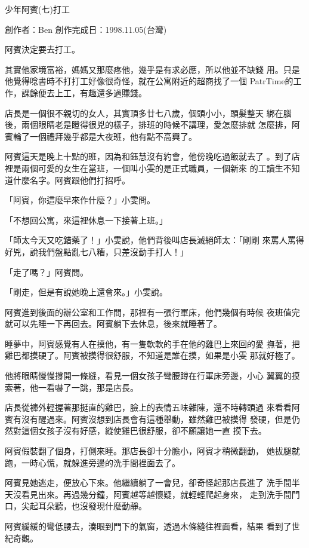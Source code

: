 



少年阿賓(七)打工

創作者：Ben
創作完成日：1998.11.05(台灣)


阿賓決定要去打工。

其實他家境富裕，媽媽又那麼疼他，幾乎是有求必應，所以他並不缺錢
用。只是他覺得唸書時不打打工好像很奇怪，就在公寓附近的超商找了一個
PatrTime的工作，課餘便去上工，有趣還多過賺錢。

店長是一個很不親切的女人，其實頂多廿七八歲，個頭小小，頭髮整天
綁在腦後，兩個眼睛老是瞪得很兇的樣子，排班的時候不講理，愛怎麼排就
怎麼排，阿賓輪了一個禮拜幾乎都是大夜班，他有點不高興了。

阿賓這天是晚上十點的班，因為和鈺慧沒有約會，他傍晚吃過飯就去了
。到了店裡是兩個可愛的女生在當班，一個叫小雯的是正式職員，一個新來
的工讀生不知道什麼名字。阿賓跟他們打招呼。

「阿賓，你這麼早來作什麼？」小雯問。

「不想回公寓，來這裡休息一下接著上班。」

「師太今天又吃錯藥了！」小雯說，他們背後叫店長滅絕師太：「剛剛
來罵人罵得好兇，說我們盤點亂七八糟，只差沒動手打人！」

「走了嗎？」阿賓問。

「剛走，但是有說她晚上還會來。」小雯說。

阿賓進到後面的辦公室和工作間，那裡有一張行軍床，他們幾個有時候
夜班值完就可以先睡一下再回去。阿賓躺下去休息，後來就睡著了。

睡夢中，阿賓感覺有人在摸他，有一隻軟軟的手在他的雞巴上來回的愛
撫著，把雞巴都摸硬了。阿賓被摸得很舒服，不知道是誰在摸，如果是小雯
那就好極了。

他將眼睛慢慢撐開一條縫，看見一個女孩子彎腰蹲在行軍床旁邊，小心
翼翼的摸索著，他一看嚇了一跳，那是店長。

店長從褲外輕握著那挺直的雞巴，臉上的表情五味雜陳，還不時轉頭過
來看看阿賓有沒有醒過來。阿賓沒想到店長會有這種舉動，雖然雞巴被摸得
發硬，但是仍然對這個女孩子沒有好感，縱使雞巴很舒服，卻不願讓她一直
摸下去。

阿賓假裝翻了個身，打側來睡。那店長卻十分膽小，阿賓才稍微翻動，
她拔腿就跑，一時心慌，就躲進旁邊的洗手間裡面去了。

阿賓見她逃走，便放心下來。他繼續躺了一會兒，卻奇怪起那店長進了
洗手間半天沒看見出來。再過幾分鐘，阿賓越等越懷疑，就輕輕爬起身來，
走到洗手間門口，尖起耳朵聽，也沒發現什麼動靜。

阿賓緩緩的彎低腰去，湊眼到門下的氣窗，透過木條縫往裡面看，結果
看到了世紀奇觀。

